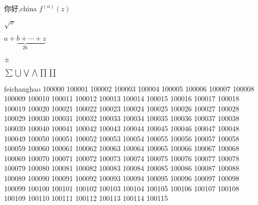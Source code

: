 \documentclass{article}
\begin{document}
你好,china
$f^{(n)}(z) $

$\sqrt{x} $

$\underbrace{a+b+\cdots+z}_{26} $

$\pm $

$\sum \bigcup \bigvee \bigwedge \prod \coprod $

feichanghao
100000
100001
100002
100003
100004
100005
100006
100007
100008
100009
100010
100011
100012
100013
100014
100015
100016
100017
100018
100019
100020
100021
100022
100023
100024
100025
100026
100027
100028
100029
100030
100031
100032
100033
100034
100035
100036
100037
100038
100039
100040
100041
100042
100043
100044
100045
100046
100047
100048
100049
100050
100051
100052
100053
100054
100055
100056
100057
100058
100059
100060
100061
100062
100063
100064
100065
100066
100067
100068
100069
100070
100071
100072
100073
100074
100075
100076
100077
100078
100079
100080
100081
100082
100083
100084
100085
100086
100087
100088
100089
100090
100091
100092
100093
100094
100095
100096
100097
100098
100099
100100
100101
100102
100103
100104
100105
100106
100107
100108
100109
100110
100111
100112
100113
100114
100115
\end{document}
